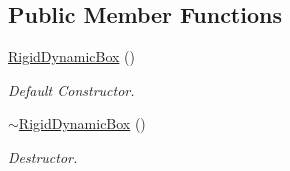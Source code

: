 \subsection*{Public Member Functions}
\begin{DoxyCompactItemize}
\item 
\hypertarget{classContent_1_1Actor_1_1Physics_1_1RigidDynamicBox_ad43ac4aa45911d6dbd0a1b19d21070d2}{
\hyperlink{classContent_1_1Actor_1_1Physics_1_1RigidDynamicBox_ad43ac4aa45911d6dbd0a1b19d21070d2}{RigidDynamicBox} ()}
\label{classContent_1_1Actor_1_1Physics_1_1RigidDynamicBox_ad43ac4aa45911d6dbd0a1b19d21070d2}

\begin{DoxyCompactList}\small\item\em Default Constructor. \item\end{DoxyCompactList}\item 
\hypertarget{classContent_1_1Actor_1_1Physics_1_1RigidDynamicBox_a5b17cdde9b39cec05a6b996fce104522}{
\hyperlink{classContent_1_1Actor_1_1Physics_1_1RigidDynamicBox_a5b17cdde9b39cec05a6b996fce104522}{$\sim$RigidDynamicBox} ()}
\label{classContent_1_1Actor_1_1Physics_1_1RigidDynamicBox_a5b17cdde9b39cec05a6b996fce104522}

\begin{DoxyCompactList}\small\item\em Destructor. \item\end{DoxyCompactList}\end{DoxyCompactItemize}
